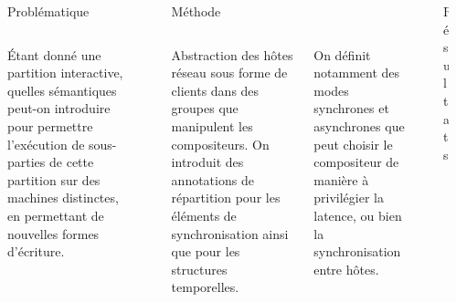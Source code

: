 \begin{columns}[t]
   \begin{column}{\sepwid}\end{column}
     \begin{column}{\onecolwid}
      \begin{block}{Problématique}
          \begin{columns}[t]
              \begin{column}{\onecolwid}\justify
                  Étant donné une partition interactive, quelles sémantiques peut-on introduire pour permettre l'exécution de sous-parties de cette partition sur des machines distinctes, en permettant de nouvelles formes d'écriture.
                \end{column}
            \end{columns}        
      \end{block}
     \end{column}
     \begin{column}{\sepwid}\end{column}
     \begin{column}{\twocolwid}
         \begin{block}{Méthode}             
             \begin{columns}[t]	                 
                 \begin{column}{\onecolwid}\justify
                     Abstraction des hôtes réseau sous forme de clients dans des groupes que manipulent les compositeurs. On introduit des annotations de répartition pour les éléments de synchronisation ainsi que pour les structures temporelles.
                     \end{column}
                     \begin{column}{\onecolwid}\justify
                     	On définit notamment des modes synchrones et asynchrones que peut choisir le compositeur de manière à privilégier la latence, ou bien la synchronisation entre hôtes.
                        \end{column}
                \end{columns}                 
            \end{block}
      \end{column}
      \begin{column}{\sepwid}\end{column}
      \begin{column}{\onecolwid}
          \begin{block}{Résultats}

\end{block}
\end{column}
\end{columns}
